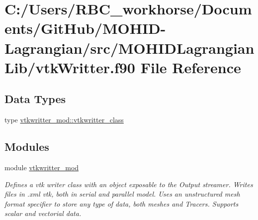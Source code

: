\hypertarget{vtk_writter_8f90}{}\section{C\+:/\+Users/\+R\+B\+C\+\_\+workhorse/\+Documents/\+Git\+Hub/\+M\+O\+H\+I\+D-\/\+Lagrangian/src/\+M\+O\+H\+I\+D\+Lagrangian\+Lib/vtk\+Writter.f90 File Reference}
\label{vtk_writter_8f90}
\subsection*{Data Types}
\begin{DoxyCompactItemize}
\item 
type \mbox{\hyperlink{structvtkwritter__mod_1_1vtkwritter__class}{vtkwritter\+\_\+mod\+::vtkwritter\+\_\+class}}
\end{DoxyCompactItemize}
\subsection*{Modules}
\begin{DoxyCompactItemize}
\item 
module \mbox{\hyperlink{namespacevtkwritter__mod}{vtkwritter\+\_\+mod}}
\begin{DoxyCompactList}\small\item\em Defines a vtk writer class with an object exposable to the Output streamer. Writes files in .xml vtk, both in serial and parallel model. Uses an unstructured mesh format specifier to store any type of data, both meshes and Tracers. Supports scalar and vectorial data. \end{DoxyCompactList}\end{DoxyCompactItemize}
